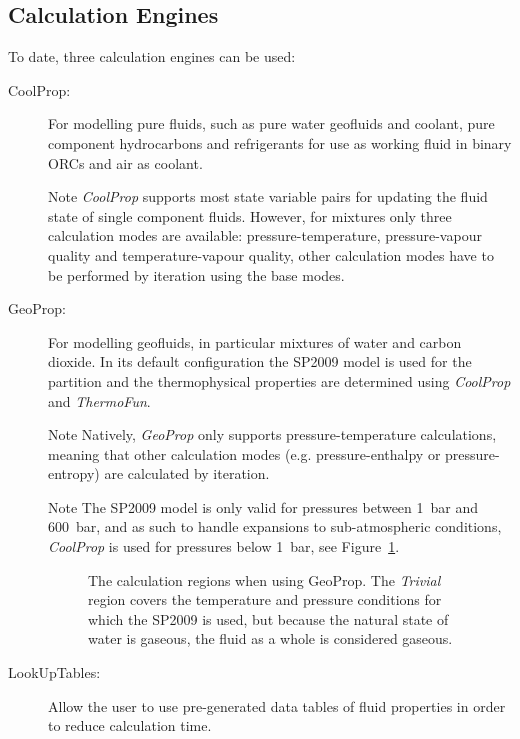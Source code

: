     \subsection{Calculation Engines}
        To date, three calculation engines can be used:
        
        \begin{description}
            \item[CoolProp:] For modelling pure fluids, such as pure water geofluids and coolant, pure component hydrocarbons and refrigerants for use as working fluid in binary \ac{ORC}s and air as coolant.

            \begin{notes}{Note}
                \emph{CoolProp} supports most state variable pairs for updating the fluid state of single component fluids. However, for mixtures only three calculation modes are available: pressure-temperature, pressure-vapour quality and temperature-vapour quality, other calculation modes have to be performed by iteration using the base modes.
            \end{notes}
            
            \item[GeoProp:] For modelling geofluids, in particular mixtures of water and carbon dioxide. In its default configuration the \ac{SP2009} model is used for the partition and the thermophysical properties are determined using \emph{CoolProp} and \emph{ThermoFun}.

            \begin{notes}{Note}
                Natively, \emph{GeoProp} only supports pressure-temperature calculations, meaning that other calculation modes (e.g. pressure-enthalpy or pressure-entropy) are calculated by iteration.
            \end{notes}

            \begin{notes}{Note}
                The \ac{SP2009} model is only valid for pressures between \qty{1}{\bar} and \qty{600}{\bar}, and as such to handle expansions to sub-atmospheric conditions, \emph{CoolProp} is used for pressures below \qty{1}{\bar}, see Figure~\ref{fig:geoprop_calc_regions}.

                \begin{figure}[H]
                    \centering
                    
                    \caption{The calculation regions when using GeoProp. The \emph{Trivial} region covers the temperature and pressure conditions for which the \ac{SP2009} is used, but because the natural state of water is gaseous, the fluid as a whole is considered gaseous.}
                    \label{fig:geoprop_calc_regions}
                \end{figure}
                
            \end{notes}
            
            \item[LookUpTables:] Allow the user to use pre-generated data tables of fluid properties in order to reduce calculation time.
        \end{description} 

